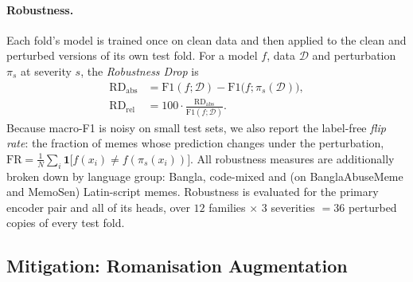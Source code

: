 \paragraph{Robustness.}
Each fold's model is trained once on clean data and then applied to the clean and perturbed versions of its own test
fold. For a model $f$, data $\mathcal{D}$ and perturbation $\pi_s$ at severity $s$, the \emph{Robustness Drop} is
\begin{equation}
\begin{aligned}
\mathrm{RD}_{\text{abs}}&=\mathrm{F1}(f;\mathcal{D})-\mathrm{F1}\big(f;\pi_s(\mathcal{D})\big),\\
\mathrm{RD}_{\text{rel}}&=100\cdot\frac{\mathrm{RD}_{\text{abs}}}{\mathrm{F1}(f;\mathcal{D})}.
\end{aligned}
\end{equation}
Because macro-F1 is noisy on small test sets, we also report the label-free \emph{flip rate}: the fraction of memes
whose prediction changes under the perturbation,
$\mathrm{FR}=\frac{1}{N}\sum_{i}\mathbf{1}\big[f(x_i)\neq f(\pi_s(x_i))\big]$.
All robustness measures are additionally broken down by language group: Bangla, code-mixed and (on BanglaAbuseMeme
and MemoSen) Latin-script memes. Robustness is evaluated for the primary encoder pair and all of its heads, over
$12$ families $\times$ $3$ severities $=36$ perturbed copies of every test fold.

\subsection{Mitigation: Romanisation Augmentation}
\label{sec:method:aug}

